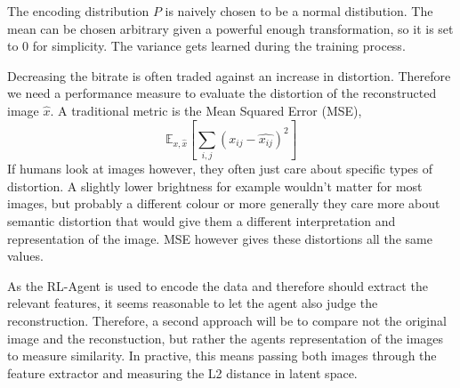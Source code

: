 


    The encoding distribution $P$ is naively chosen to be a normal distibution. The
    mean can be chosen arbitrary given a powerful enough transformation, so it is
    set to 0 for simplicity. The variance gets learned during the training process.


    Decreasing the bitrate is often traded against an increase in distortion.
    Therefore we need a performance measure to evaluate the distortion of the
    reconstructed image $\hat{x}$. A traditional metric is the Mean Squared Error (MSE),
    \begin{equation}\label{equ:L2}
        \mathbb{E}_{x, \hat{x}}[\sum_{i,j} (x_{ij} - \hat{x_{ij}})^2]
    \end{equation}
    If humans look at images however, they often just care about specific types
    of distortion. A slightly lower brightness for example wouldn't matter for
    most images, but probably a different colour or more generally they care
    more about semantic distortion that would give them a different
    interpretation and representation of the image. MSE however gives these
    distortions all the same values.

    As the RL-Agent is used to encode the data and therefore should extract the
    relevant features, it seems reasonable to let the agent also judge the
    reconstruction. Therefore, a second approach will be to compare not the
    original image and the reconstuction, but rather the agents representation
    of the images to measure similarity. In practive, this means passing both
    images through the feature extractor and measuring the L2 distance in latent
    space.








